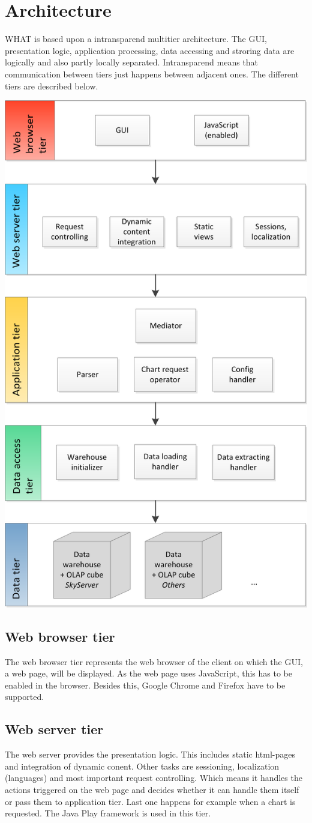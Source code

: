 \section{Architecture}

WHAT is based upon a intransparend multitier architecture. 
The GUI, presentation logic, application processing, data accessing and stroring data
are logically and also partly locally separated. Intransparend means that communication
between tiers just happens between adjacent ones. The different tiers are described below.


\begin{center}
\includegraphics[width=0.6\linewidth]{Pictures/TierArchi.png} 
\end{center}   


\subsection{Web browser tier}
The web browser tier represents the web browser of the client on which the GUI, a web page, will be displayed.
As the web page uses JavaScript, this has to be enabled in the browser. 
Besides this, Google Chrome and Firefox have to be supported. 


\subsection{Web server tier}
The web server provides the presentation logic. This includes static html-pages and integration of dynamic
conent. Other tasks are sessioning, localization (languages) and most important request controlling. 
Which means it handles the actions triggered on the web page and decides whether it can handle them itself 
or pass them to application tier. Last one happens for example when a chart is requested. 
The Java Play framework is used in this tier.


